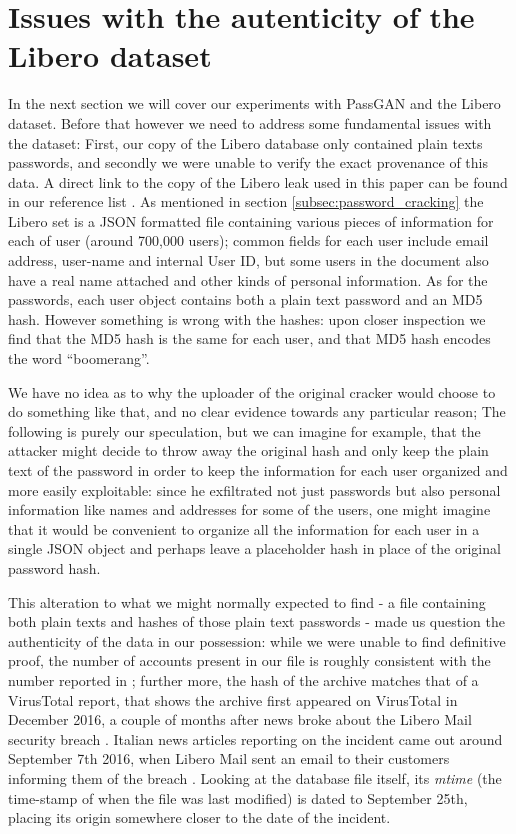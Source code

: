 \section{Issues with the autenticity of the Libero dataset}\label{sec:libero}
In the next section we will cover our experiments with PassGAN and the Libero dataset.
Before that however we need to address some fundamental issues with the dataset: First, our copy of the Libero database only contained plain texts passwords, and secondly we were unable to verify the exact provenance of this data.
A direct link to the copy of the Libero leak used in this paper can be found in our reference list \cite{passgan-download}.
As mentioned in section \ref{subsec:password_cracking} the Libero set is a JSON formatted file containing various pieces of information for each of user (around 700,000 users); common fields for each user include email address, user-name and internal User ID, but some users in the document also have a real name attached and other kinds of personal information.  As for the passwords, each user object contains both a plain text password and an MD5 hash.
However something is wrong with the hashes: upon closer inspection we find that the MD5 hash is the same for each user, and that MD5 hash encodes the word \enquote{boomerang}.

We have no idea as to why the uploader of the original cracker would choose to do something like that, and no clear evidence towards any particular reason; The following is purely our speculation, but we can imagine for example, that the attacker might decide to throw away the original hash and only keep the plain text of the password in order to keep the information for each user organized and more easily exploitable: since he exfiltrated not just passwords but also personal information like names and addresses for some of the users, one might imagine that it would be convenient to organize all the information for each user in a single JSON object and perhaps leave a placeholder hash in place of the original password hash.

This alteration to what we might normally expected to find - a file containing both plain texts and hashes of those plain text passwords - made us question the authenticity of the data in our possession: while we were unable to find definitive proof, the number of accounts present in our file is roughly consistent with the number reported in \cite{libero_leak}; further more, the hash of the archive matches that of a VirusTotal report, that shows the archive first appeared on VirusTotal in December 2016, a couple of months after news broke about the Libero Mail security breach \cite{virus_total}.
Italian news articles reporting on the incident came out around September 7th 2016, when Libero Mail sent an email to their customers informing them of the breach \cite{libero-news-wired,libero-news-tomhw,libero-news-fanpage}.
Looking at the database file itself, its \emph{mtime} (the time-stamp of when the file was last modified) is dated to September 25th, placing its origin somewhere closer to the date of the incident. 

